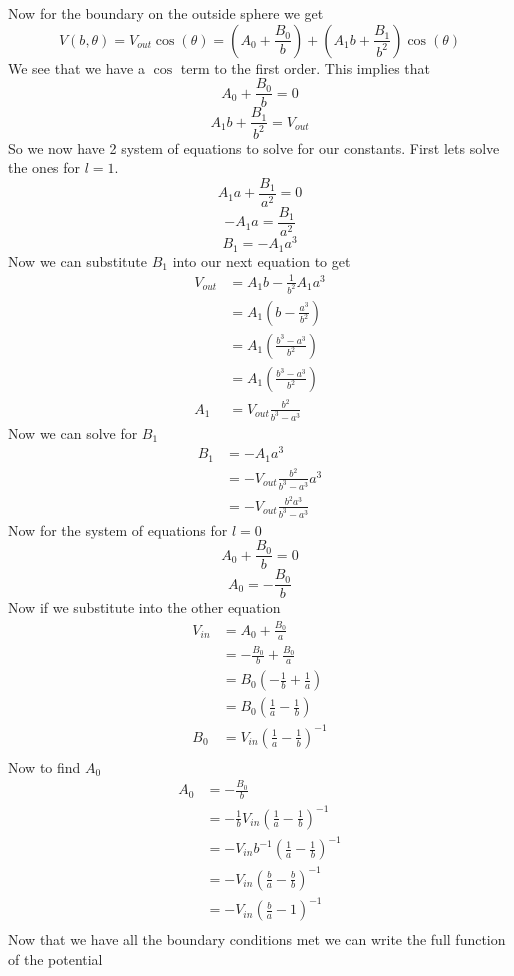 \documentclass[11pt]{article}
\numberwithin{equation}{section}
\begin{document}
Now for the boundary on the outside sphere we get
$$V(b,\theta) = V_{out} \cos(\theta) = \left(A_0+\frac{B_0}{b}\right) + \left(A_1b+\frac{B_1}{b^{2}}\right)\cos(\theta)$$
We see that we have a $\cos$ term to the first order. This implies that
$$A_0+\frac{B_0}{b}=0 $$
$$A_1b+\frac{B_1}{b^{2}}=V_{out}$$
So we now have 2 system of equations to solve for our constants. First lets solve the ones for $l=1$.
$$A_1a+\frac{B_1}{a^2} = 0$$
$$-A_1a=\frac{B_1}{a^2}$$
$$B_1=-A_1 a^3$$
Now we can substitute $B_1$ into our next equation to get
\begin{align*}
V_{out} &= A_1b-\frac{1}{b^{2}}A_1 a^3\\
&=A_1\left(b-\frac{a^3}{b^{2}}\right)\\
&=A_1\left(\frac{b^3-a^3}{b^{2}}\right)\\
&=A_1\left(\frac{b^3-a^3}{b^{2}}\right)\\
A_1&=V_{out}\frac{b^{2}}{b^3-a^3}
\end{align*}
Now we can solve for $B_1$
\begin{align*}
B_1&=-A_1 a^3\\
&=-V_{out}\frac{b^{2}}{b^3-a^3}a^3\\
&=-V_{out}\frac{b^{2}a^3}{b^3-a^3}
\end{align*}
Now for the system of equations for $l=0$
$$A_0+\frac{B_0}{b}=0 $$
$$A_0=-\frac{B_0}{b}$$
Now if we substitute into the other equation
\begin{align*}
V_{in}&=A_0+\frac{B_0}{a} \\
&=-\frac{B_0}{b}+\frac{B_0}{a} \\
&=B_0\left(-\frac{1}{b}+\frac{1}{a}\right) \\
&=B_0\left(\frac{1}{a}-\frac{1}{b}\right) \\
B_0&=V_{in}\left(\frac{1}{a}-\frac{1}{b}\right)^{-1} \\
\end{align*}
Now to find $A_0$
\begin{align*}
A_0 &=-\frac{B_0}{b}\\
&=-\frac{1}{b}V_{in}\left(\frac{1}{a}-\frac{1}{b}\right)^{-1} \\
&=-V_{in}b^{-1}\left(\frac{1}{a}-\frac{1}{b}\right)^{-1} \\
&=-V_{in}\left(\frac{b}{a}-\frac{b}{b}\right)^{-1} \\
&=-V_{in}\left(\frac{b}{a}-1\right)^{-1} \\
\end{align*}
Now that we have all the boundary conditions met we can write the full function of the potential
\end{document}

